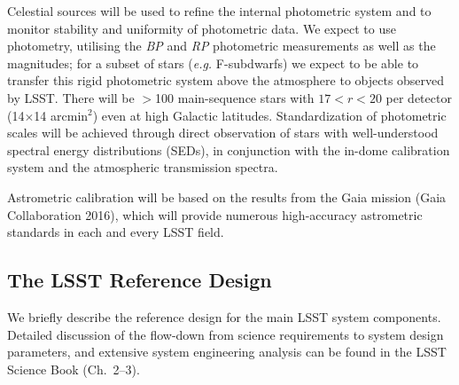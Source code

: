 Celestial sources will be used to refine the internal photometric system and
to monitor stability and uniformity of photometric data. We expect to use \cite{Gaia2016} photometry, utilising
the \textit{BP} and \textit{RP} photometric measurements as well as the  magnitudes; for a subset
of stars (\textit{e.g.} F-subdwarfs) we expect to be able to transfer this rigid photometric system above
the atmosphere to objects observed by LSST.
There will be
$>$100 main-sequence stars with $17<r<20$ per detector (14$\times$14 arcmin$^2$)
even at high Galactic latitudes. Standardization of photometric scales will be
achieved through direct observation of stars with well-understood spectral
energy distributions (SEDs), in conjunction with the in-dome calibration system and the atmospheric transmission spectra.

Astrometric calibration will be based on the results from the Gaia mission (Gaia Collaboration 2016), which will provide
numerous high-accuracy astrometric standards in each and every LSST field.

\subsection{     The LSST  Reference Design    }

We briefly describe the reference design for the main LSST system components.
Detailed discussion of the flow-down from science requirements to system
design parameters, and extensive system engineering analysis can be
found in the LSST Science Book (Ch.~2--3).

